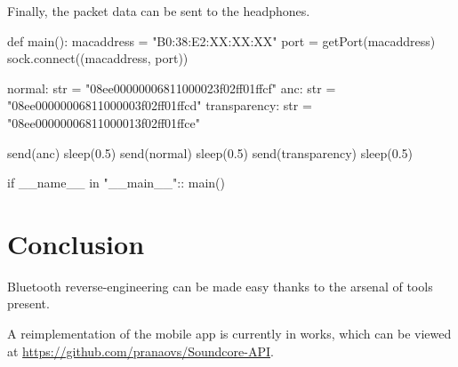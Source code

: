 \documentclass{article}
\theoremstyle{mytheoremstyle}
\theoremstyle{mytheoremstyle}
\theoremstyle{myproblemstyle}
\begin{document}
Finally, the packet data can be sent to the headphones\cite{soundcore-ref}.
\begin{python}
def main():
  macaddress = "B0:38:E2:XX:XX:XX"
  port = getPort(macaddress)
  sock.connect((macaddress, port))

  normal: str = "08ee00000006811000023f02ff01ffcf"
  anc: str = "08ee00000006811000003f02ff01ffcd"
  transparency: str = "08ee00000006811000013f02ff01ffce"

  send(anc)
  sleep(0.5)
  send(normal)
  sleep(0.5)
  send(transparency)
  sleep(0.5)

if __name__ in "__main__"::
  main()
\end{python}

\section{Conclusion}

Bluetooth reverse-engineering can be made easy thanks to the arsenal of tools present.

A reimplementation of the mobile app is currently in works, which can be viewed at \href{https://github.com/pranaovs/Soundcore-API}{https://github.com/pranaovs/Soundcore-API}.

\printbibliography
\end{document}
